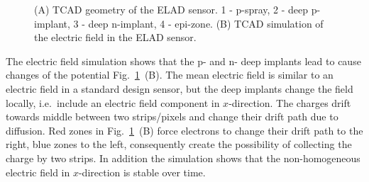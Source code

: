 \begin{figure}[t]
\begin{minipage}[h]{0.5\linewidth}
\end{minipage}
\hfill 
\begin{minipage}[h]{0.5\linewidth}
\end{minipage}
\caption[short description here]
 {(A) TCAD geometry of the ELAD sensor. 1 - p-spray, 2 - deep p-implant, 3 - deep n-implant, 4 - epi-zone. 
 (B) TCAD simulation of the electric field in the ELAD sensor. 
 }
\label{fig:geo-elfield}
\end{figure}

The electric field simulation shows that the p- and n- deep implants lead to cause changes of the potential Fig.~\ref{fig:geo-elfield}~(B). %
The mean electric field is similar to an electric field in a standard design sensor, but the deep implants change the field locally, i.e.\ include an electric field component in $x$-direction. %
The charges drift towards middle between two strips/pixels and change their drift path due to diffusion. %
Red zones in Fig.~\ref{fig:geo-elfield}~(B) force electrons to change their drift path to the right, blue zones to the left, consequently create the possibility of collecting the charge by two strips. 
In addition the simulation shows that the non-homogeneous electric field in $x$-direction is stable over time. 


